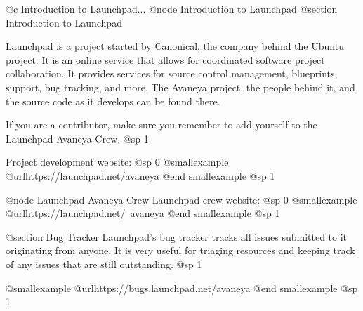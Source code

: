 @c Introduction to Launchpad...
@node Introduction to Launchpad
@section Introduction to Launchpad

Launchpad is a project started by Canonical, the company behind the Ubuntu project. It is an online service that allows for coordinated software project collaboration. It provides services for source control management, blueprints, support, bug tracking, and more. The Avaneya project, the people behind it, and the source code as it develops can be found there.

If you are a contributor, make sure you remember to add yourself to the Launchpad Avaneya Crew.
@sp 1

Project development website:
@sp 0
@smallexample
@url{https://launchpad.net/avaneya}
@end smallexample
@sp 1

@node Launchpad Avaneya Crew
Launchpad crew website:
@sp 0
@smallexample
@url{https://launchpad.net/~avaneya}
@end smallexample
@sp 1

@section Bug Tracker
Launchpad's bug tracker tracks all issues submitted to it originating from anyone. It is very useful for triaging resources and keeping track of any issues that are still outstanding.
@sp 1

@smallexample
@url{https://bugs.launchpad.net/avaneya}
@end smallexample
@sp 1


